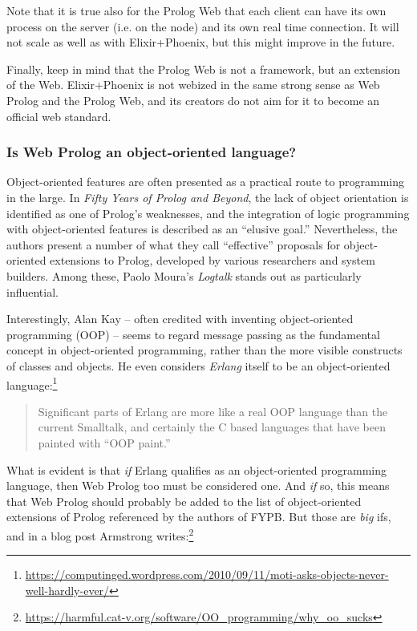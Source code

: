 Note that it is true also for the Prolog Web that each client can have its own process on the server (i.e. on the node) and its own real time connection. It will not scale as well as with Elixir+Phoenix, but this might improve in the future.

Finally, keep in mind that the Prolog Web is not a framework, but an extension of the Web. Elixir+Phoenix is not webized in the same strong sense as Web Prolog and the Prolog Web, and its creators do not aim for it to become an official web standard.\\


\subsubsection{Is Web Prolog an object-oriented language?}\label{sec:OOP}

Object-oriented features are often presented as a practical route to programming in the large. In \textit{Fifty Years of Prolog and Beyond}, the lack of object orientation is identified as one of Prolog's weaknesses, and the integration of logic programming with object-oriented features is described as an ``elusive goal.'' Nevertheless, the authors present a number of what they call ``effective'' proposals for object-oriented extensions to Prolog, developed by various researchers and system builders. Among these, Paolo Moura's \textit{Logtalk} stands out as particularly influential. 

Interestingly, Alan Kay -- often credited with inventing object-oriented programming (OOP) -- seems to regard message passing as the fundamental concept in object-oriented programming, rather than the more visible constructs of classes and objects. He even considers \textit{Erlang} itself to be an object-oriented language:\footnote{\url{https://computinged.wordpress.com/2010/09/11/moti-asks-objects-never-well-hardly-ever/}}

\begin{quotation}
Significant parts of Erlang are more like a real OOP language than the current Smalltalk, and certainly the C based languages that have been painted with ``OOP paint.''
\end{quotation}

\noindent What is evident is that \textit{if} Erlang qualifies as an object-oriented programming language, then Web Prolog too must be considered one. And \textit{if} so, this means that Web Prolog should probably be added to the list of object-oriented extensions of Prolog referenced by the authors of FYPB. But those are \textit{big} ifs, and in a blog post Armstrong writes:\footnote{\url{https://harmful.cat-v.org/software/OO\_programming/why\_oo\_sucks}}

